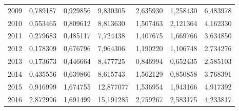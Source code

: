 \begin{table}
\begin{tabular}{p{1cm}p{2cm}p{2cm}p{2cm}p{2cm}p{2cm}p{2cm}}
 2009 &                               0,789187 &                  0,929856 &                                    9,830305 &                            2,635930 &             1,258430 &                    6,483978 \\
 2010 &                               0,553465 &                  0,809612 &                                    8,813630 &                            1,507463 &             2,121364 &                    4,162330 \\
 2011 &                               0,279683 &                  0,485117 &                                    7,724438 &                            1,407675 &             1,669766 &                    3,634850 \\
 2012 &                               0,178309 &                  0,676796 &                                    7,964306 &                            1,190220 &             1,106748 &                    2,734276 \\
 2013 &                               0,173673 &                  0,446664 &                                    8,477725 &                            0,846994 &             0,652435 &                    2,585103 \\
 2014 &                               0,435556 &                  0,639866 &                                    8,615743 &                            1,562129 &             0,850858 &                    3,768391 \\
 2015 &                               0,916999 &                  1,674755 &                                   12,877077 &                            1,536954 &             1,943166 &                    4,917392 \\
 2016 &                               2,872996 &                  1,691499 &                                   15,191285 &                            2,759267 &             2,583175 &                    4,233817 \\
\bottomrule
\end{tabular}
\end{table}
